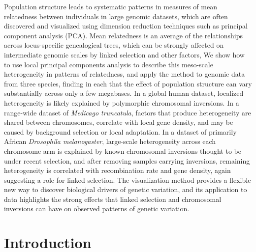\documentclass[11pt, oneside]{article}   	%
\begin{document}
Population structure leads to systematic patterns in measures of mean relatedness
between individuals in large genomic datasets,
which are often discovered and visualized using dimension reduction techniques such as principal component analysis (PCA).
Mean relatedness
is an average of the relationships across locus-specific genealogical trees,
which can be strongly affected on intermediate genomic scales by linked selection and other factors,
We show how to use local principal components analysis to describe this 
meso-scale heterogeneity in patterns of relatedness,
and apply the method to genomic data from three species,
finding in each that the effect of population structure 
can vary substantially across only a few megabases.
In a global human dataset, localized heterogeneity is likely explained by polymorphic chromosomal inversions.
In a range-wide dataset of \textit{Medicago truncatula},
factors that produce heterogeneity are shared between chromosomes,
correlate with local gene density,
and may be caused by background selection or local adaptation.
In a dataset of primarily African \textit{Drosophila melanogaster}, large-scale heterogeneity across each chromosome arm
is explained by known chromosomal inversions thought to be under recent selection,
and after removing samples carrying inversions, remaining heterogeneity is correlated with recombination rate and gene density,
again suggesting a role for linked selection.
The visualization method provides a flexible new way to discover biological drivers of genetic variation,
and its application to data highlights the strong effects that linked selection and chromosomal inversions
can have on observed patterns of genetic variation.



\section{Introduction}

\end{document}
